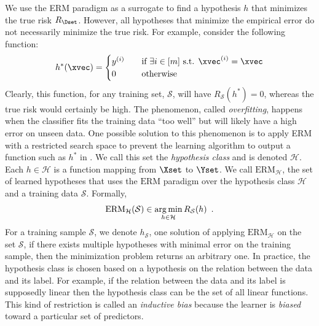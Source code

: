 We use the ERM paradigm as a surrogate to find a hypothesis $h$ that minimizes the true risk $R_\Dset$.
However, all hypotheses that minimize the empirical error do not necessarily minimize the true risk.
For example, consider the following function:
\begin{equation} \label{equation:ch2-perfect_function}
  h^*(\xvec) =
  \begin{cases}
    y^{(i)} &\quad \text{if }\exists i \in [m] \text{ s.t. } \xvec^{(i)} = \xvec \\
    0 &\quad \text{otherwise}
  \end{cases}
\end{equation}
Clearly, this function, for any training set, $\mathcal{S}$, will have $R_\mathcal{S}(h^*) = 0$, whereas the true risk would certainly be high.
The phenomenon, called \emph{overfitting}, happens when the classifier fits the training data ``too well'' but will likely have a high error on unseen data.
One possible solution to this phenomenon is to apply ERM with a restricted search space to prevent the learning algorithm to output a function such as $h^*$ in .
We call this set the \emph{hypothesis class} and is denoted $\mathcal{H}$.
Each $h \in \mathcal{H}$ is a function mapping from $\Xset$ to $\Yset$.
We call $\mathrm{ERM}_{\mathcal{H}}$, the set of learned hypotheses that uses the $\mathrm{ERM}$ paradigm over the hypothesis class $\mathcal{H}$ and a training data $\mathcal{S}$.
Formally,
\begin{equation}
  \mathrm{ERM}_{\mathcal{H}}(\mathcal{S}) \in \operatorname*{arg\,min}_{h \in \mathcal{H}} R_{\mathcal{S}}(h) \enspace.
\end{equation}
For a training sample $\mathcal{S}$, we denote $h_\mathcal{S}$, one solution of applying $\text{ERM}_\mathcal{H}$ on the set $\mathcal{S}$, if there exists multiple hypotheses with minimal error on the training sample, then the minimization problem returns an arbitrary one.
In practice, the hypothesis class is chosen based on a hypothesis on the relation between the data and its label.
For example, if the relation between the data and its label is supposedly linear then the hypothesis class can be the set of all linear functions.
This kind of restriction is called an \emph{inductive bias} because the learner is \emph{biased} toward a particular set of predictors.

